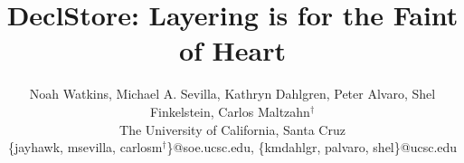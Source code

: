 \documentclass[letterpaper,twocolumn,10pt]{article}
\begin{document}

\title{DeclStore: Layering is for the Faint of Heart}

\author{
{\rm Noah Watkins, Michael A. Sevilla, Kathryn Dahlgren, Peter Alvaro, Shel Finkelstein, Carlos Maltzahn$^{\dag}$}\\
The University of California, Santa Cruz\\
\{jayhawk, msevilla, carlosm$^{\dag}$\}@soe.ucsc.edu, \{kmdahlgr, palvaro, shel\}@ucsc.edu
} %

\maketitle











{\footnotesize 
}
\end{document}
